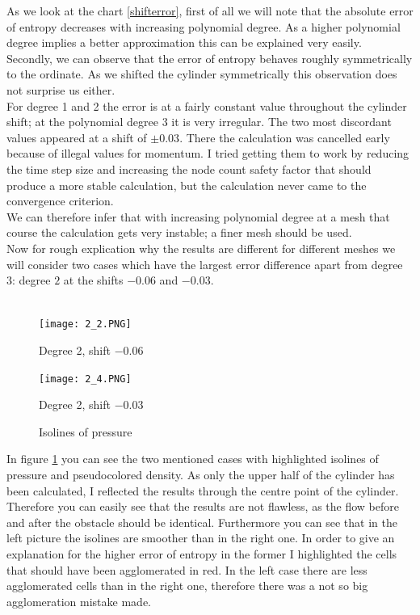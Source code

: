 	As we look at the chart \ref{shifterror}, first of all we will note that the absolute error of entropy decreases with increasing polynomial degree. As a higher polynomial degree implies a better approximation this can be explained very easily. \\ \indent
	Secondly, we can observe that the error of entropy behaves roughly symmetrically to the ordinate. As we shifted the cylinder symmetrically this observation does not surprise us either. \\ \indent
	For degree 1 and 2 the error is at a fairly constant value throughout the cylinder shift; at the polynomial degree 3 it is very irregular. The two most discordant values appeared at a shift of $\pm 0.03$. There the calculation was cancelled early because of illegal values for momentum. I tried getting them to work by reducing the time step size and increasing the node count safety factor that should produce a more stable calculation, but the calculation never came to the convergence criterion. \\ \indent
	We can therefore infer that with increasing polynomial degree at a mesh that course the calculation gets very instable; a finer mesh should be used. \\ \indent
	Now for rough explication why the results are different for different meshes we will consider two cases which have the largest error difference apart from degree 3: degree $2$ at the shifts $-0.06$ and $-0.03$. \\\\
	
	\begin{figure}[htp]
		\centering
		\begin{minipage}[b]{0.5\textwidth}
			\centering
			\texttt{[image: 2\_2.PNG]}
			\caption*{Degree 2, shift $-0.06$}
			\label{fig:2_2}
		\end{minipage}%
		\begin{minipage}[b]{0.5\textwidth}
			\centering
			\texttt{[image: 2\_4.PNG]}
			\caption*{Degree 2, shift $-0.03$}
			\label{fig:2_4}
		\end{minipage}
		\caption{Isolines of pressure}\label{fig:isoshift}
	\end{figure}
	
	In figure \ref{fig:isoshift} you can see the two mentioned cases with highlighted isolines of pressure and pseudocolored density. As only the upper half of the cylinder has been calculated, I reflected the results through the centre point of the cylinder. Therefore you can easily see that the results are not flawless, as the flow before and after the obstacle should be identical. Furthermore you can see that in the left picture the isolines are smoother than in the right one. In order to give an explanation for the higher error of entropy in the former I highlighted the cells that should have been agglomerated in red. In the left case there are less agglomerated cells than in the right one, therefore there was a not so big agglomeration mistake made.\\\\ 
	
